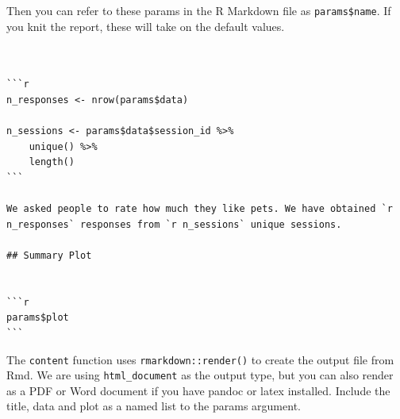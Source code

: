 \documentclass[
  oneside]{book}
\newenvironment{Shaded}{\begin{snugshade}}{\end{snugshade}}
\newcommand{\AttributeTok}[1]{\textcolor[rgb]{0.77,0.63,0.00}{#1}}
\newcommand{\CharTok}[1]{\textcolor[rgb]{0.31,0.60,0.02}{#1}}
\newcommand{\FunctionTok}[1]{\textcolor[rgb]{0.00,0.00,0.00}{#1}}
\newcommand{\KeywordTok}[1]{\textcolor[rgb]{0.13,0.29,0.53}{\textbf{#1}}}
\newcommand{\PreprocessorTok}[1]{\textcolor[rgb]{0.56,0.35,0.01}{\textit{#1}}}
\newcommand{\StringTok}[1]{\textcolor[rgb]{0.31,0.60,0.02}{#1}}
\begin{document}
\begin{Shaded}
\end{Shaded}

Then you can refer to these params in the R Markdown file as \texttt{params\$name}. If you knit the report, these will take on the default values.

\begin{verbatim}


```r
n_responses <- nrow(params$data)

n_sessions <- params$data$session_id %>%
    unique() %>%
    length()
```

We asked people to rate how much they like pets. We have obtained `r n_responses` responses from `r n_sessions` unique sessions.

## Summary Plot


```r
params$plot
```
\end{verbatim}

The \texttt{content} function uses \texttt{rmarkdown::render}\texttt{()} to create the output file from Rmd. We are using \texttt{html\_document} as the output type, but you can also render as a PDF or Word document if you have pandoc or latex installed. Include the \AttributeTok{title}, \AttributeTok{data} and \AttributeTok{plot} as a named list to the \AttributeTok{params} argument.
\end{document}

